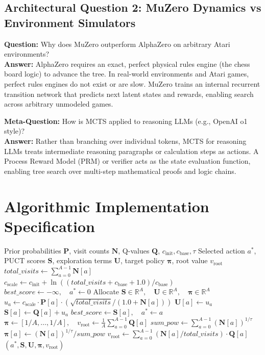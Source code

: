 \documentclass[11pt,a4paper]{article}
\theoremstyle{definition}
\begin{document}
\subsection{Architectural Question 2: MuZero Dynamics vs Environment Simulators}
\textbf{Question:} Why does MuZero outperform AlphaZero on arbitrary Atari environments?\\
\textbf{Answer:} AlphaZero requires an exact, perfect physical rules engine (the chess board logic) to advance the tree. In real-world environments and Atari games, perfect rules engines do not exist or are slow. MuZero trains an internal recurrent transition network that predicts next latent states and rewards, enabling search across arbitrary unmodeled games.

\textbf{Meta-Question:} How is MCTS applied to reasoning LLMs (e.g., OpenAI o1 style)?\\
\textbf{Answer:} Rather than branching over individual tokens, MCTS for reasoning LLMs treats intermediate reasoning paragraphs or calculation steps as actions. A Process Reward Model (PRM) or verifier acts as the state evaluation function, enabling tree search over multi-step mathematical proofs and logic chains.

\section{Algorithmic Implementation Specification}

\begin{algorithm}[H]
\caption{MCTS PUCT Action Selection and Target Extraction}
\begin{algorithmic}[1]
\Require Prior probabilities $\mathbf{P}$, visit counts $\mathbf{N}$, Q-values $\mathbf{Q}$, $c_{\text{init}}, c_{\text{base}}, \tau$
\Ensure Selected action $a^*$, PUCT scores $\mathbf{S}$, exploration terms $\mathbf{U}$, target policy $\boldsymbol{\pi}$, root value $v_{\text{root}}$
\State $total\_visits \gets \sum_{a=0}^{A-1} \mathbf{N}[a]$
\State $c_{\text{scale}} \gets c_{\text{init}} + \ln((total\_visits + c_{\text{base}} + 1.0) / c_{\text{base}})$
\State $best\_score \gets -\infty, \quad a^* \gets 0$
\State Allocate $\mathbf{S} \in \mathbb{R}^A, \quad \mathbf{U} \in \mathbb{R}^A, \quad \boldsymbol{\pi} \in \mathbb{R}^A$
    \State $u_a \gets c_{\text{scale}} \cdot \mathbf{P}[a] \cdot (\sqrt{total\_visits} / (1.0 + \mathbf{N}[a]))$
    \State $\mathbf{U}[a] \gets u_a$
    \State $\mathbf{S}[a] \gets \mathbf{Q}[a] + u_a$
        \State $best\_score \gets \mathbf{S}[a], \quad a^* \gets a$
    \EndIf
\EndFor
{}
    \State $\boldsymbol{\pi} \gets [1/A, \dots, 1/A], \quad v_{\text{root}} \gets \frac{1}{A}\sum_{a=0}^{A-1} \mathbf{Q}[a]$
\Else
    \State $sum\_pow \gets \sum_{a=0}^{A-1} (\mathbf{N}[a])^{1/\tau}$
        \State $\boldsymbol{\pi}[a] \gets (\mathbf{N}[a])^{1/\tau} / sum\_pow$
    \EndFor
    \State $v_{\text{root}} \gets \sum_{a=0}^{A-1} (\mathbf{N}[a] / total\_visits) \cdot \mathbf{Q}[a]$
\EndIf
\State \Return $(a^*, \mathbf{S}, \mathbf{U}, \boldsymbol{\pi}, v_{\text{root}})$
\end{algorithmic}
\end{algorithm}
\end{document}

